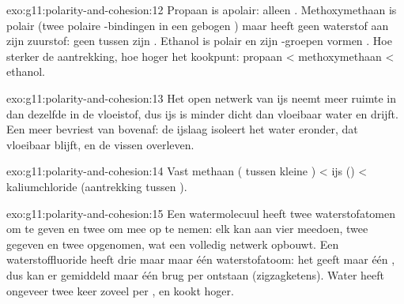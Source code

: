 \begin{solution}{exo:g11:polarity-and-cohesion:12}
Propaan is apolair: alleen . Methoxymethaan is polair
(twee polaire -bindingen in een gebogen ) maar heeft
geen waterstof aan zijn zuurstof: geen  tussen zijn
. Ethanol is polair en zijn -groepen vormen
. Hoe sterker de aantrekking, hoe hoger het kookpunt:
propaan < methoxymethaan < ethanol.
\end{solution}

\begin{solution}{exo:g11:polarity-and-cohesion:13}
Het open netwerk van ijs neemt meer ruimte in dan dezelfde  in
de vloeistof, dus ijs is minder dicht dan vloeibaar water en drijft. Een
meer bevriest van bovenaf: de ijslaag isoleert het water eronder, dat
vloeibaar blijft, en de vissen overleven.
\end{solution}

\begin{solution}{exo:g11:polarity-and-cohesion:14}
Vast methaan ( tussen kleine ) < ijs
() < kaliumchloride (aantrekking tussen ).
\end{solution}

\begin{solution}{exo:g11:polarity-and-cohesion:15}
Een watermolecuul heeft twee waterstofatomen om te geven en twee  om mee op te nemen: elk  kan aan vier
 meedoen, twee gegeven en twee opgenomen, wat een
volledig netwerk opbouwt. Een  waterstoffluoride heeft drie  maar maar één waterstofatoom: het geeft maar één
, dus kan er gemiddeld maar één brug per  ontstaan
(zigzagketens). Water heeft ongeveer twee keer zoveel 
per , en kookt hoger.
\end{solution}

